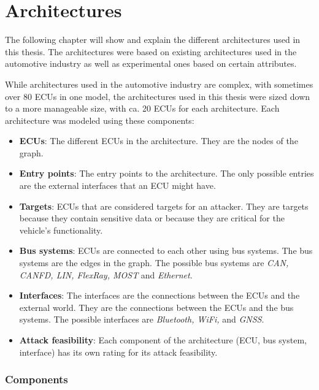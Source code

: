 \chapter{Architectures}
\label{chp:arch}

The following chapter will show and explain the different architectures used in this thesis.
The architectures were based on existing architectures used in the automotive industry as well as experimental ones based on certain attributes.

While architectures used in the automotive industry are complex, with sometimes over 80 ECUs in one model, 
the architectures used in this thesis were sized down to a more manageable size, with ca. 20 ECUs for each architecture.
Each architecture was modeled using these components:

\begin{itemize}

    \item \textbf{ECUs}: The different ECUs in the architecture. They are the nodes of the graph.
    
    \item \textbf{Entry points}: The entry points to the architecture. The only possible entries are the external interfaces that an ECU might have.
    
    \item \textbf{Targets}: ECUs that are considered targets for an attacker. They are targets because they contain sensitive data or because they are critical for the vehicle's functionality.
    
    \item \textbf{Bus systems}: ECUs are connected to each other using bus systems. The bus systems are the edges in the graph. The possible bus systems are \textit{CAN, CANFD, LIN, FlexRay, MOST} and \textit{Ethernet}.
    
    \item \textbf{Interfaces}: The interfaces are the connections between the ECUs and the external world. They are the connections between the ECUs and the bus systems. The possible interfaces are \textit{Bluetooth, WiFi,} and \textit{GNSS}.
    
    \item \textbf{Attack feasibility}: Each component of the architecture (ECU, bus system, interface) has its own rating for its attack feasibility.

\end{itemize}

\subsection{Components}
\label{sec:components}

